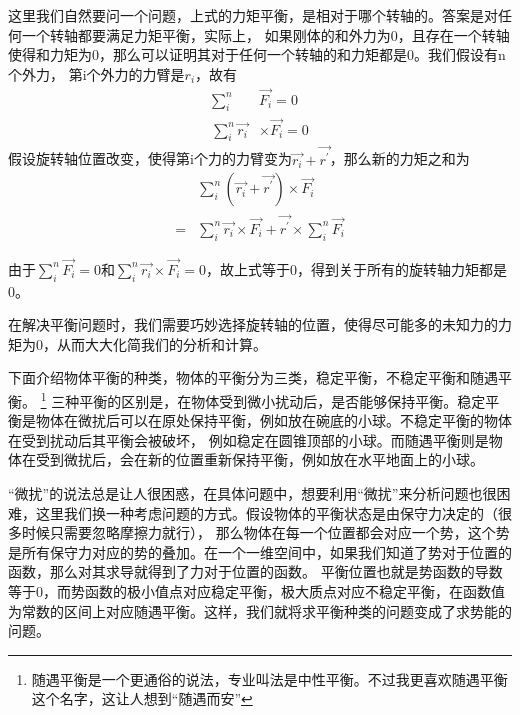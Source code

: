 \documentclass{article}
\begin{document}
    这里我们自然要问一个问题，上式的力矩平衡，是相对于哪个转轴的。答案是对任何一个转轴都要满足力矩平衡，实际上，
    如果刚体的和外力为0，且存在一个转轴使得和力矩为0，那么可以证明其对于任何一个转轴的和力矩都是0。我们假设有n个外力，
    第i个外力的力臂是\(r_i\)，故有
    \begin{align*}
        \sum_i^n &\vec{F_i} = 0 \\
        \sum_i^n \vec{r_i} &\times \vec{F_i} = 0
    \end{align*}
    假设旋转轴位置改变，使得第i个力的力臂变为\(\vec{r_i} + \vec{r^\prime}\)，那么新的力矩之和为
    \begin{align*}
          & \sum_i^n (\vec{r_i} + \vec{r^\prime}) \times \vec{F_i} \\
        = & \sum_i^n \vec{r_i} \times \vec{F_i} + \vec{r^\prime} \times \sum_i^n \vec{F_i}
    \end{align*}

    由于\(\displaystyle \sum_i^n \vec{F_i} = 0\)和\(\displaystyle \sum_i^n \vec{r_i} \times \vec{F_i} = 0\)，故上式等于0，得到关于所有的旋转轴力矩都是0。

    在解决平衡问题时，我们需要巧妙选择旋转轴的位置，使得尽可能多的未知力的力矩为0，从而大大化简我们的分析和计算。

    下面介绍物体平衡的种类，物体的平衡分为三类，稳定平衡，不稳定平衡和随遇平衡。
    \footnote{随遇平衡是一个更通俗的说法，专业叫法是中性平衡。不过我更喜欢随遇平衡这个名字，这让人想到“随遇而安”}
    三种平衡的区别是，在物体受到微小扰动后，是否能够保持平衡。稳定平衡是物体在微扰后可以在原处保持平衡，例如放在碗底的小球。不稳定平衡的物体在受到扰动后其平衡会被破坏，
    例如稳定在圆锥顶部的小球。而随遇平衡则是物体在受到微扰后，会在新的位置重新保持平衡，例如放在水平地面上的小球。

    “微扰”的说法总是让人很困惑，在具体问题中，想要利用“微扰”来分析问题也很困难，这里我们换一种考虑问题的方式。假设物体的平衡状态是由保守力决定的（很多时候只需要忽略摩擦力就行），
    那么物体在每一个位置都会对应一个势，这个势是所有保守力对应的势的叠加。在一个一维空间中，如果我们知道了势对于位置的函数，那么对其求导就得到了力对于位置的函数。
    平衡位置也就是势函数的导数等于0，而势函数的极小值点对应稳定平衡，极大质点对应不稳定平衡，在函数值为常数的区间上对应随遇平衡。这样，我们就将求平衡种类的问题变成了求势能的问题。

    
\end{document}
